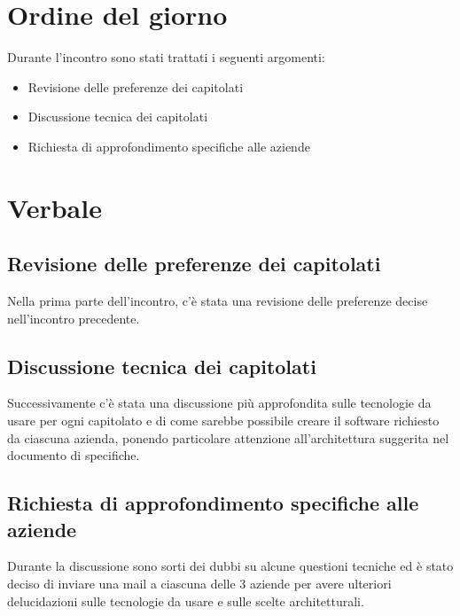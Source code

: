 \documentclass[italian, 12pt]{article}
\begin{document}
\section{Ordine del giorno}
Durante l'incontro sono stati trattati i seguenti argomenti: 
\begin{flushleft}
        \begin{itemize}
            \item Revisione delle preferenze dei capitolati
            \item Discussione tecnica dei capitolati 
            \item Richiesta di approfondimento specifiche alle aziende
        \end{itemize}
\end{flushleft}
\newpage

\section{Verbale}
\subsection{Revisione delle preferenze dei capitolati}
Nella prima parte dell'incontro, c'è stata una revisione delle preferenze decise nell'incontro precedente.

\subsection{Discussione tecnica dei capitolati}
Successivamente c'è stata una discussione più approfondita sulle tecnologie da usare per ogni capitolato e di come sarebbe possibile creare il software richiesto da ciascuna azienda, ponendo particolare attenzione all'architettura suggerita nel documento di specifiche.

\subsection{Richiesta di approfondimento specifiche alle aziende}
Durante la discussione sono sorti dei dubbi su alcune questioni tecniche ed è stato deciso di inviare una mail a ciascuna delle 3 aziende per avere ulteriori delucidazioni sulle tecnologie da usare e sulle scelte architetturali.
\end{document}
